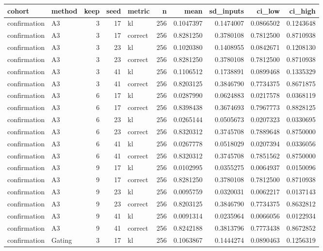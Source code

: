 \begin{tabular}{llrrlrrrrr}
\toprule
cohort & method & keep & seed & metric & n & mean & sd_inputs & ci_low & ci_high \\
\midrule
confirmation & A3 & 3 & 17 & kl & 256 & 0.1047397 & 0.1474007 & 0.0866502 & 0.1243648 \\
confirmation & A3 & 3 & 17 & correct & 256 & 0.8281250 & 0.3780108 & 0.7812500 & 0.8710938 \\
confirmation & A3 & 3 & 23 & kl & 256 & 0.1020380 & 0.1408955 & 0.0842671 & 0.1208130 \\
confirmation & A3 & 3 & 23 & correct & 256 & 0.8281250 & 0.3780108 & 0.7812500 & 0.8710938 \\
confirmation & A3 & 3 & 41 & kl & 256 & 0.1106512 & 0.1738891 & 0.0899468 & 0.1335329 \\
confirmation & A3 & 3 & 41 & correct & 256 & 0.8203125 & 0.3846790 & 0.7734375 & 0.8671875 \\
confirmation & A3 & 6 & 17 & kl & 256 & 0.0287990 & 0.0624883 & 0.0217578 & 0.0368119 \\
confirmation & A3 & 6 & 17 & correct & 256 & 0.8398438 & 0.3674693 & 0.7967773 & 0.8828125 \\
confirmation & A3 & 6 & 23 & kl & 256 & 0.0265144 & 0.0505673 & 0.0207323 & 0.0330695 \\
confirmation & A3 & 6 & 23 & correct & 256 & 0.8320312 & 0.3745708 & 0.7889648 & 0.8750000 \\
confirmation & A3 & 6 & 41 & kl & 256 & 0.0267778 & 0.0518029 & 0.0207394 & 0.0336056 \\
confirmation & A3 & 6 & 41 & correct & 256 & 0.8320312 & 0.3745708 & 0.7851562 & 0.8750000 \\
confirmation & A3 & 9 & 17 & kl & 256 & 0.0102995 & 0.0355275 & 0.0064937 & 0.0150096 \\
confirmation & A3 & 9 & 17 & correct & 256 & 0.8281250 & 0.3780108 & 0.7812500 & 0.8710938 \\
confirmation & A3 & 9 & 23 & kl & 256 & 0.0095759 & 0.0320031 & 0.0062217 & 0.0137143 \\
confirmation & A3 & 9 & 23 & correct & 256 & 0.8203125 & 0.3846790 & 0.7734375 & 0.8632812 \\
confirmation & A3 & 9 & 41 & kl & 256 & 0.0091314 & 0.0235964 & 0.0066056 & 0.0122934 \\
confirmation & A3 & 9 & 41 & correct & 256 & 0.8242188 & 0.3813796 & 0.7773438 & 0.8672852 \\
confirmation & Gating & 3 & 17 & kl & 256 & 0.1063867 & 0.1444274 & 0.0890463 & 0.1256319 \\

\end{tabular}
